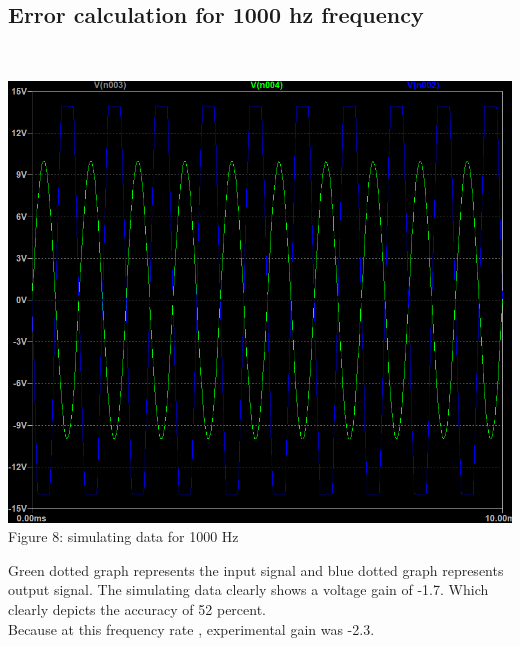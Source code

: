 \documentclass[12pt]{article}
\begin{document}
\subsection{Error calculation for 1000 hz frequency}\\
[1cm]
\begin{center}
    \includegraphics[scale=.4]{1khz_lab1.png}\\
    \caption{Figure 8: simulating data for 1000 Hz}
\end{center}
Green dotted graph represents the input signal and blue dotted graph represents output signal. The simulating data clearly shows a voltage gain of -1.7. Which clearly depicts the accuracy of 52 percent.\\
Because at this frequency rate , experimental gain was -2.3.\\
\end{document}
